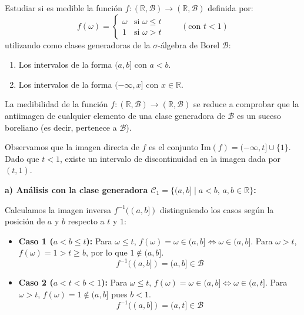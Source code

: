 \newpage
\begin{problema}
Estudiar si es medible la función $f : (\mathbb{R}, \mathcal{B}) \to (\mathbb{R}, \mathcal{B})$ definida por:
\[
    f(\omega) = \begin{cases} \omega & \text{si } \omega \le t \\ 1 & \text{si } \omega > t \end{cases} \qquad (\text{con } t < 1)
\]
utilizando como clases generadoras de la $\sigma$-álgebra de Borel $\mathcal{B}$:
\begin{enumerate}[label=\alph*)]
    \item Los intervalos de la forma $(a, b]$ con $a < b$.
    \item Los intervalos de la forma $(-\infty, x]$ con $x \in \mathbb{R}$.
\end{enumerate}

\tcblower

La medibilidad de la función $f : (\mathbb{R}, \mathcal{B}) \to (\mathbb{R}, \mathcal{B})$ se reduce a comprobar que la antiimagen de cualquier elemento de una clase generadora de $\mathcal{B}$ es un suceso boreliano (es decir, pertenece a $\mathcal{B}$).

Observamos que la imagen directa de $f$ es el conjunto $\mathrm{Im}(f) = (-\infty, t] \cup \{1\}$. Dado que $t < 1$, existe un intervalo de discontinuidad en la imagen dada por $(t, 1)$.

\textbf{a) Análisis con la clase generadora $\mathcal{C}_1 = \{(a, b] \mid a < b, \, a,b \in \mathbb{R}\}$:}

Calculamos la imagen inversa $f^{-1}((a, b])$ distinguiendo los casos según la posición de $a$ y $b$ respecto a $t$ y $1$:

\begin{itemize}
    \item \textbf{Caso 1 ($a < b \le t$):}
    Para $\omega \le t$, $f(\omega) = \omega \in (a, b] \iff \omega \in (a, b]$.
    Para $\omega > t$, $f(\omega) = 1 > t \ge b$, por lo que $1 \notin (a, b]$.
    \[
        f^{-1}((a, b]) = (a, b] \in \mathcal{B}
    \]

    \item \textbf{Caso 2 ($a < t < b < 1$):}
    Para $\omega \le t$, $f(\omega) = \omega \in (a, b] \iff \omega \in (a, t]$.
    Para $\omega > t$, $f(\omega) = 1 \notin (a, b]$ pues $b < 1$.
    \[
        f^{-1}((a, b]) = (a, t] \in \mathcal{B}
    \]


\end{itemize}
\end{problema}
